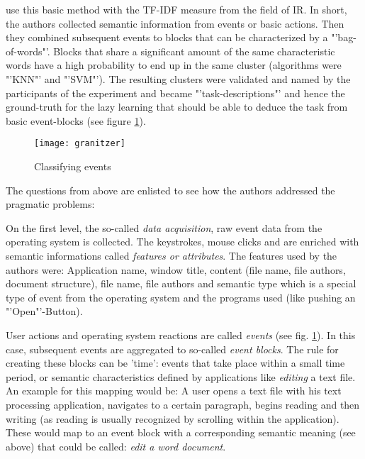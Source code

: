 \cite{granitzer2008analysis} use this basic method with the \ac{TF-IDF} measure from the field of \ac{IR}. In short, the authors collected semantic information from events or basic actions. Then they combined subsequent events to blocks that can be characterized by a "'bag-of-words"'. Blocks that share a significant amount of the same characteristic words have a high probability to end up in the same cluster (algorithms were "'KNN"' and "'SVM"'). The resulting clusters were validated and named by the participants of the experiment and became "'task-descriptions"' and hence the ground-truth for the lazy learning  that should be able to deduce the task from basic event-blocks (see figure \ref{fig11}).
\begin{figure}[ht]
	\centering
  \texttt{[image: granitzer]}
	\caption{Classifying events}
	\label{fig11}
\end{figure}
The questions from above are enlisted to see how the authors addressed the pragmatic problems:


On the first level, the so-called \textit{data acquisition}, raw event data from the operating system is collected. The  keystrokes, mouse clicks and are enriched with semantic informations called \textit{features or attributes}. The features used by the authors were: Application name, window title, content (file  name, file authors, document structure), file name, file authors and semantic type which is a special type of event from the operating system and the programs used (like pushing an "'Open"'-Button).


User actions and operating system reactions are called \textit{events} (see fig. \ref{fig11}).  In this case, subsequent events are aggregated to so-called \textit{event blocks}. The rule for creating these blocks can be 'time': events that take place within a small time period, or semantic characteristics defined by applications like \textit{editing} a text file. An example for this mapping would be: A user opens a text file with his text processing application, navigates to a certain paragraph, begins reading and then writing (as reading is usually recognized by scrolling within the application). These would map to an event block with a corresponding semantic meaning (see above) that could be called: \textit{edit a word document}. 

